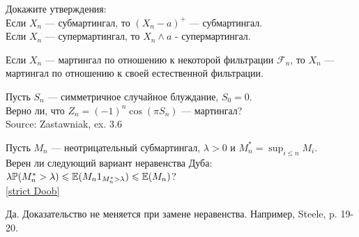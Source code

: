 \begin{problem}
Докажите утверждения: \\
Если $X_{n}$ — субмартингал, то $(X_{n}-a)^{+}$ — субмартингал. \\
Если $X_{n}$ — супермартингал, то $X_{n} \wedge a$ -
супермартингал.

\begin{sol}

\end{sol}
\end{problem}

\begin{problem}
Если $X_{n}$ — мартингал по отношению к некоторой фильтрации
$\mathcal{F}_{n}$, то $X_{n}$ — мартингал по отношению к своей
естественной фильтрации.

\begin{sol}

\end{sol}
\end{problem}

\begin{problem}
Пусть $S_{n}$ — симметричное случайное блуждание, $S_{0}=0$. \\
Верно ли, что $Z_{n}=(-1)^{n}\cos(\pi S_{n})$ — мартингал? \\
Source: Zastawniak, ex. 3.6

\begin{sol}

\end{sol}
\end{problem}

\begin{problem}
\label{strict Doob} Пусть $M_{n}$ — неотрицательный субмартингал,
$\lambda>0$ и
$M_{n}^{*}=\sup_{i\le n}M_{i}$. \\
Верен ли следующий вариант неравенства Дуба: $\lambda
\mathbb{P}(M_{n}^{*}>\lambda)\leqslant \mathbb{E}(M_{n}1_{M_{n}^{*}>\lambda})\leqslant
\mathbb{E}(M_{n})$? \\
\ref{strict Doob}

\begin{sol}

Да. Доказательство не меняется при замене неравенства. Например,
Steele, p. 19-20.
\end{sol}
\end{problem}

